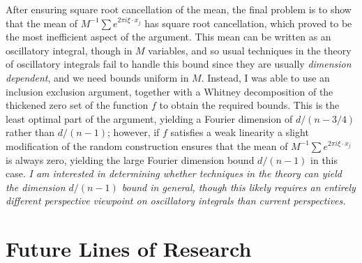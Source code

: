 \documentclass[11pt]{article}
\begin{document}
After ensuring square root cancellation of the mean, the final problem is to show that the mean of $M^{-1} \sum e^{2 \pi i \xi \cdot x_j}$ has square root cancellation, which proved to be the most inefficient aspect of the argument. This mean can be written as an oscillatory integral, though in $M$ variables, and so usual techniques in the theory of oscillatory integrals fail to handle this bound since they are usually \emph{dimension dependent}, and we need bounds uniform in $M$. Instead, I was able to use an inclusion exclusion argument, together with a Whitney decomposition of the thickened zero set of the function $f$ to obtain the required bounds. This is the least optimal part of the argument, yielding a Fourier dimension of $d/(n-3/4)$ rather than $d/(n-1)$; however, if $f$ satisfies a weak linearity a slight modification of the random construction ensures that the mean of $M^{-1} \sum e^{2 \pi i \xi \cdot x_j}$ is always zero, yielding the large Fourier dimension bound $d/(n-1)$ in this case. \emph{I am interested in determining whether techniques in the theory can yield the dimension $d/(n-1)$ bound in general, though this likely requires an entirely different perspective viewpoint on oscillatory integrals than current perspectives.}%

\section{Future Lines of Research} \label{Section3}
\end{document}
